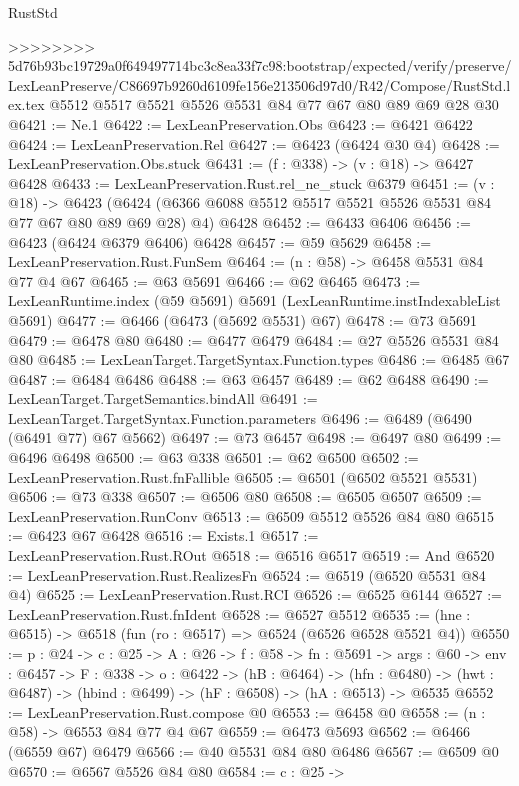 \begin{lexlean}{RustStd}
\begin{coremodule}
{\begin{coremodule}
{{{{{{{{{{>>>>>>>> 5d76b93bc19729a0f649497714bc3c8ea33f7c98:bootstrap/expected/verify/preserve/LexLeanPreserve/C86697b9260d6109fe156e213506d97d0/R42/Compose/RustStd.lex.tex
    @5512
    @5517
    @5521
    @5526
    @5531
    @84
    @77
    @67
    @80
    @89
    @69
    @28
    @30
@6421 := Ne.{1}
@6422 := LexLeanPreservation.Obs
@6423 := @6421 @6422
@6424 := LexLeanPreservation.Rel
@6427 := @6423 (@6424 @30 @4)
@6428 := LexLeanPreservation.Obs.stuck
@6431 := (f : @338) -> (v : @18) -> @6427 @6428
@6433 := LexLeanPreservation.Rust.rel_ne_stuck @6379
@6451 := (v : @18) ->
  @6423 (@6424 (@6366 @6088 @5512 @5517 @5521 @5526 @5531 @84 @77 @67 @80 @89 @69 @28) @4) @6428
@6452 := @6433 @6406
@6456 := @6423 (@6424 @6379 @6406) @6428
@6457 := @59 @5629
@6458 := LexLeanPreservation.Rust.FunSem
@6464 := (n : @58) -> @6458 @5531 @84 @77 @4 @67
@6465 := @63 @5691
@6466 := @62 @6465
@6473 := LexLeanRuntime.index (@59 @5691) @5691 (LexLeanRuntime.instIndexableList @5691)
@6477 := @6466 (@6473 (@5692 @5531) @67)
@6478 := @73 @5691
@6479 := @6478 @80
@6480 := @6477 @6479
@6484 := @27 @5526 @5531 @84 @80
@6485 := LexLeanTarget.TargetSyntax.Function.types
@6486 := @6485 @67
@6487 := @6484 @6486
@6488 := @63 @6457
@6489 := @62 @6488
@6490 := LexLeanTarget.TargetSemantics.bindAll
@6491 := LexLeanTarget.TargetSyntax.Function.parameters
@6496 := @6489 (@6490 (@6491 @77) @67 @5662)
@6497 := @73 @6457
@6498 := @6497 @80
@6499 := @6496 @6498
@6500 := @63 @338
@6501 := @62 @6500
@6502 := LexLeanPreservation.Rust.fnFallible
@6505 := @6501 (@6502 @5521 @5531)
@6506 := @73 @338
@6507 := @6506 @80
@6508 := @6505 @6507
@6509 := LexLeanPreservation.RunConv
@6513 := @6509 @5512 @5526 @84 @80
@6515 := @6423 @67 @6428
@6516 := Exists.{1}
@6517 := LexLeanPreservation.Rust.ROut
@6518 := @6516 @6517
@6519 := And
@6520 := LexLeanPreservation.Rust.RealizesFn
@6524 := @6519 (@6520 @5531 @84 @4)
@6525 := LexLeanPreservation.Rust.RCI
@6526 := @6525 @6144
@6527 := LexLeanPreservation.Rust.fnIdent
@6528 := @6527 @5512
@6535 := (hne : @6515) -> @6518 (fun (ro : @6517) => @6524 (@6526 @6528 @5521 @4))
@6550 := {p : @24} ->
  {c : @25} ->
  {A : @26} ->
  {f : @58} ->
  {fn : @5691} ->
  {args : @60} ->
  {env : @6457} ->
  {F : @338} ->
  {o : @6422} ->
  (hB : @6464) ->
  (hfn : @6480) -> (hwt : @6487) -> (hbind : @6499) -> (hF : @6508) -> (hA : @6513) -> @6535
@6552 := LexLeanPreservation.Rust.compose @0
@6553 := @6458 @0
@6558 := (n : @58) -> @6553 @84 @77 @4 @67
@6559 := @6473 @5693
@6562 := @6466 (@6559 @67) @6479
@6566 := @40 @5531 @84 @80 @6486
@6567 := @6509 @0
@6570 := @6567 @5526 @84 @80
@6584 := {c : @25} ->
}}}}}}}}}}
\end{coremodule}}
\end{coremodule}
\end{lexlean}
